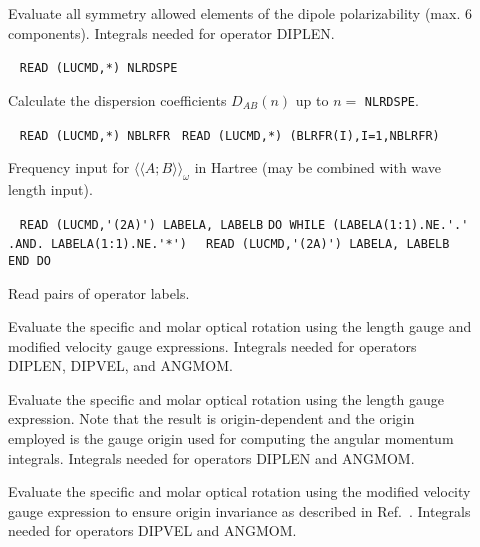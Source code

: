 \begin{description}
\item[] 
Evaluate all symmetry allowed elements of the dipole polarizability
(max. 6 components).
Integrals needed for operator DIPLEN.

\item[] \verb| |\newline
   \verb|READ (LUCMD,*) NLRDSPE|

   Calculate the dispersion coefficients 
   $D_{AB}(n)$ up to $n = $ \verb+NLRDSPE+.

\item[] \verb| |\newline
   \verb|READ (LUCMD,*) NBLRFR |\newline
   \verb|READ (LUCMD,*) (BLRFR(I),I=1,NBLRFR)|

Frequency input for $\langle\langle A;B \rangle\rangle_{\omega}$ in
Hartree (may be combined with wave length input).

%
%
%
\item[] \verb| |\newline
   \verb|READ (LUCMD,'(2A)') LABELA, LABELB|\newline
   \verb|DO WHILE (LABELA(1:1).NE.'.' .AND. LABELA(1:1).NE.'*')|\newline
   \verb|  READ (LUCMD,'(2A)') LABELA, LABELB|\newline
   \verb|END DO|

Read pairs of operator labels. 

\item[] 
Evaluate the specific and molar optical rotation using the length gauge
and modified velocity gauge
expressions.
Integrals needed for operators DIPLEN, DIPVEL, and ANGMOM.

\item[] 
Evaluate the specific and molar optical rotation using the length gauge
expression. Note that the result is origin-dependent and the origin employed
is the gauge origin used for computing the angular momentum integrals.
Integrals needed for operators DIPLEN and ANGMOM.

\item[] 
Evaluate the specific and molar optical rotation using the modified velocity
gauge
expression to ensure origin invariance as described in
Ref.\ \cite{Pedersen:ORMVE}.
Integrals needed for operators DIPVEL and ANGMOM.


\end{description}

